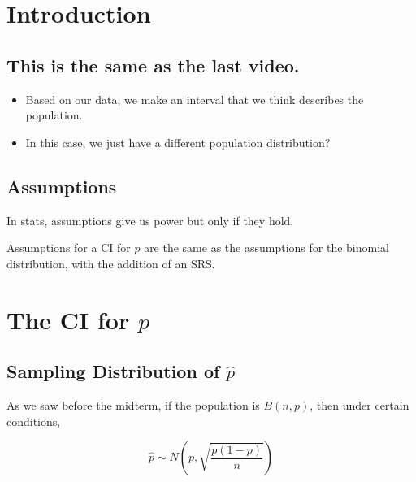 \documentclass[
  letterpaper,
  DIV=11,
  numbers=noendperiod]{scrreprt}
\def\pause{}
\begin{document}
\hypertarget{introduction-6}{%
\section{Introduction}\label{introduction-6}}

\hypertarget{this-is-the-same-as-the-last-video.}{%
\subsection{This is the same as the last
video.}\label{this-is-the-same-as-the-last-video.}}

\begin{itemize}
\item
  Based on our data, we make an interval that we think describes the
  population.\newline\pause
\item
  In this case, we just have a different population distribution?
\end{itemize}

\hypertarget{assumptions}{%
\subsection{Assumptions}\label{assumptions}}

In stats, assumptions give us power \pause but only if they hold.

\pause

Assumptions for a CI for \(p\) are the same as the assumptions for the
binomial distribution, with the addition of an SRS.

\hypertarget{the-ci-for-p}{%
\section{\texorpdfstring{The CI for
\(p\)}{The CI for p}}\label{the-ci-for-p}}

\hypertarget{sampling-distribution-of-hat-p}{%
\subsection{\texorpdfstring{Sampling Distribution of
\(\hat p\)}{Sampling Distribution of \textbackslash hat p}}\label{sampling-distribution-of-hat-p}}

As we saw before the midterm, if the population is \(B(n,p)\), then
under certain conditions,

\[\hat p \sim N\left(p, \sqrt{\frac{p(1-p)}{n}}\right)\]
\end{document}
